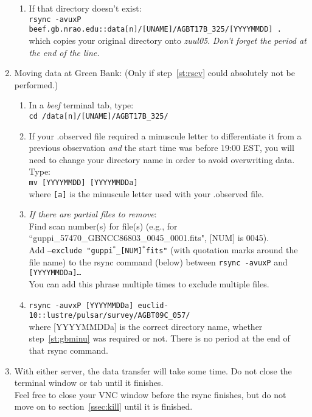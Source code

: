 \documentclass[11pt]{article}
\begin{document}
\begin{enumerate}
\begin{enumerate}
  \item If that directory doesn't exist: \\
  \texttt{rsync -avuxP beef.gb.nrao.edu::data[n]/[UNAME]/AGBT17B\_325/[YYYYMMDD]\,.} \\
  which copies your original directory onto \textit{zuul05}.    \textit{Don't forget the period at the end of the line.}
  \end{enumerate}
 \item\label{st:rsgb} Moving data at Green Bank: (Only if step~\ref{st:rscv} could absolutely not be performed.)\begin{enumerate}
  \item In a {\it beef} terminal tab, type: \\
  {\tt cd /data[n]/[UNAME]/AGBT17B\_325/}
  \item\label{st:gbminu} If your .observed file required a minuscule letter to differentiate it from a previous observation {\it and} the start time was before 19:00 EST, you will need to change your directory name in order to avoid overwriting data.  Type: \\
  {\tt mv [YYYYMMDD] [YYYYMMDDa]} \\
  where {\tt [a]} is the minuscule letter used with your .observed file.  
  \item\textit{If there are partial files to remove}: \\
  Find scan number(s) for file(s) (e.g., for ``guppi\_57470\_GBNCC86803\_0045\_0001.fits", [NUM] is 0045). \\
  Add \texttt{--exclude "guppi$^*$\_[NUM]$^*$fits"} (with quotation marks around the file name) to the rsync command (below) between \texttt{rsync -avuxP} and \texttt{[YYYYMMDDa]\dots} \\
  You can add this phrase multiple times to exclude multiple files.  
  \item {\tt rsync -auvxP [YYYYMMDDa] euclid-10::lustre/pulsar/survey/AGBT09C\_057/} \\
  where [YYYYMMDDa] is the correct directory name, whether step~\ref{st:gbminu} was required or not.  There is no period at the end of that rsync command.  
  \end{enumerate}
 \item\label{st:rsynct} With either server, the data transfer will take some time.  Do not close the terminal window or tab until it finishes.  \\
 Feel free to close your VNC window before the rsync finishes, but do not move on to section~\ref{ssec:kill} until it is finished. 
\end{enumerate}
\end{document}
